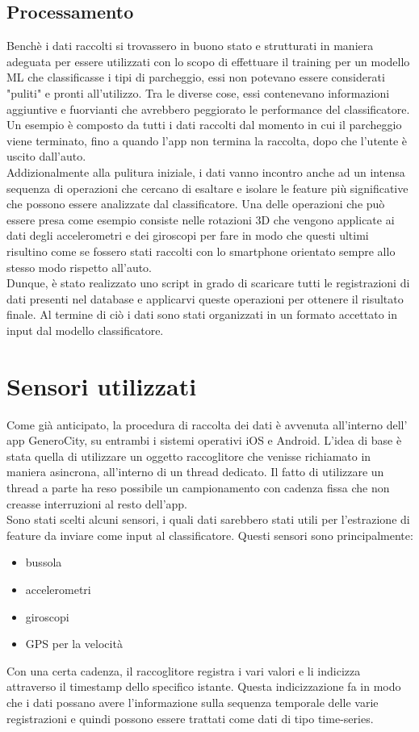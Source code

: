 \subsection{Processamento}

Benchè i dati raccolti si trovassero in buono stato e strutturati in maniera adeguata per 
essere utilizzati con lo scopo di effettuare il training per un modello ML che classificasse
i tipi di parcheggio, essi non potevano essere considerati "puliti" e pronti all'utilizzo.
Tra le diverse cose, essi contenevano informazioni aggiuntive e fuorvianti che avrebbero
peggiorato le performance del classificatore. Un esempio è composto da tutti i dati raccolti
dal momento in cui il parcheggio viene terminato, fino a quando l'app non termina la raccolta,
dopo che l'utente è uscito dall'auto.\\
Addizionalmente alla pulitura iniziale, i dati vanno incontro anche ad un intensa sequenza
di operazioni che cercano di esaltare e isolare le feature più significative che possono
essere analizzate dal classificatore. Una delle operazioni che può essere presa come esempio 
consiste nelle rotazioni 3D che vengono applicate ai dati degli accelerometri e dei giroscopi
per fare in modo che questi ultimi risultino come se fossero stati raccolti con lo smartphone
orientato sempre allo stesso modo rispetto all'auto.\\
Dunque, è stato realizzato uno script in grado di scaricare tutti le registrazioni di dati
presenti nel database e applicarvi queste operazioni per ottenere il risultato finale.
Al termine di ciò i dati sono stati organizzati in un formato accettato in input dal 
modello classificatore.


\section{Sensori utilizzati} 

Come già anticipato, la procedura di raccolta dei dati è avvenuta all'interno dell'
app GeneroCity, su entrambi i sistemi operativi iOS e Android. L'idea di base è stata
quella di utilizzare un oggetto raccoglitore che venisse richiamato in maniera
asincrona, all'interno di un thread dedicato. Il fatto di utilizzare un thread a parte
ha reso possibile un campionamento con cadenza fissa che non creasse interruzioni al
resto dell'app.\\
Sono stati scelti alcuni sensori, i quali dati sarebbero stati utili per l'estrazione
di feature da inviare come input al classificatore. Questi sensori sono principalmente:
\begin{itemize}
    \item bussola
    \item accelerometri
    \item giroscopi
    \item GPS per la velocità
\end{itemize}
Con una certa cadenza, il raccoglitore registra i vari valori e li indicizza
attraverso il timestamp dello specifico istante. Questa indicizzazione fa in modo
che i dati possano avere l'informazione sulla sequenza temporale delle varie
registrazioni e quindi possono essere trattati come dati di tipo time-series.

